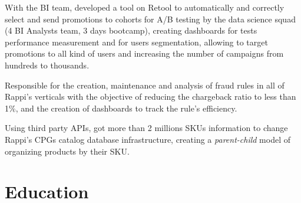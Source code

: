 \documentclass[a4paper]{deedy-resume-openfont}
\begin{document}
\textbf{}
\begin{tightemize}
\item \textbf{} With the BI team, developed a tool on Retool to automatically and correctly select and send promotions to cohorts for A/B testing by the data science squad (4 BI Analysts team, 3 days bootcamp), creating dashboards for tests performance measurement and for users segmentation, allowing to target promotions to all kind of users and increasing the number of campaigns from hundreds to thousands.

\item \textbf{} Responsible for the creation, maintenance and analysis of fraud rules in all of Rappi's verticals with the objective of reducing the chargeback ratio to less than 1\%, and the creation of dashboards to track the rule's efficiency.


\item \textbf{} Using third party APIs, got more than 2 millions SKUs information to change Rappi's CPGs catalog database infrastructure, creating a \emph{parent-child} model of organizing products by their SKU.
\end{tightemize}





\section{Education}
\end{document}
